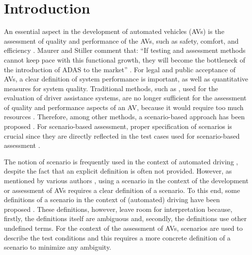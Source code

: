 \section{Introduction}
\label{sec:introduction}

An essential aspect in the development of automated vehicles (AVs) is the assessment of quality and performance of the AVs, such as safety, comfort, and efficiency \cite{bengler2014threedecades, stellet2015taxonomy, Helmer2017safety, putz2017pegasus, roesener2017comprehensive, gietelink2006development, roesener2016scenariobased, wachenfeld2016release}. 
Maurer and Stiller comment that: ``If testing and assessment methods cannot keep pace with this functional growth, they will become the bottleneck of the introduction of ADAS to the market'' \cite{bengler2014threedecades}.
For legal and public acceptance of AVs, a clear definition of system performance is important, as well as quantitative measures for system quality. 
Traditional methods, such as \cite{response2006code, ISO26262}, used for the evaluation of driver assistance systems, are no longer sufficient for the assessment of quality and performance aspects of an AV, because it would require too much resources \cite{wachenfeld2016release}. 
Therefore, among other methods, a scenario-based approach has been proposed \cite{roesener2016scenariobased, putz2017pegasus}. 
For scenario-based assessment, proper specification of scenarios is crucial since they are directly reflected in the test cases used for scenario-based assessment \cite{stellet2015taxonomy}. 

The notion of scenario is frequently used in the context of automated driving \cite{putz2017pegasus, roesener2017comprehensive, gietelink2006development, hulshof2013autonomous, karaduman2013interactivebehavior, englund2016grand, xu2002effects, ebner2011identifying, ploeg2017GCDC, zofka2015datadrivetrafficscenarios}, despite the fact that an explicit definition is often not provided. However, as mentioned by various authors \cite{stellet2015taxonomy, Helmer2017safety, alvarez2017prospective, zofka2015datadrivetrafficscenarios, aparicio2013pre, lesemann2011test, putz2017pegasus, geyer2014, ulbrich2015}, using a scenario in the context of the development or assessment of AVs requires a clear definition of a scenario. To this end, some definitions of a scenario in the context of (automated) driving have been proposed \cite{geyer2014, ulbrich2015, elrofai2016scenario}.
\cbstart
These definitions, however, leave room for interpretation because, firstly, the definitions itself are ambiguous and, secondly, the definitions use other undefined terms.
For the context of the assessment of AVs, scenarios are used to describe the test conditions \cite{stellet2015taxonomy} and this requires a more concrete definition of a scenario to minimize any ambiguity.
\cbend

